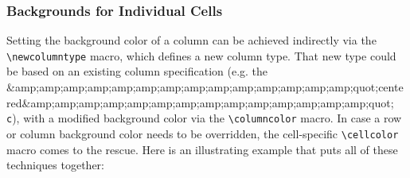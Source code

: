 \subsubsection{Backgrounds for Individual Cells}

Setting the background color of a column can be achieved indirectly via the \verb|\newcolumntype| macro, which defines a new column type. That new type could be based on an existing column specification (e.g. the &amp;amp;amp;amp;amp;amp;amp;amp;amp;amp;amp;amp;amp;amp;quot;centered&amp;amp;amp;amp;amp;amp;amp;amp;amp;amp;amp;amp;amp;amp;quot; \verb|c|), with a modified background color via the \verb|\columncolor| macro. In case a row or column background color needs to be overridden, the cell-specific \verb|\cellcolor| macro comes to the rescue. Here is an illustrating example that puts all of these techniques together:

